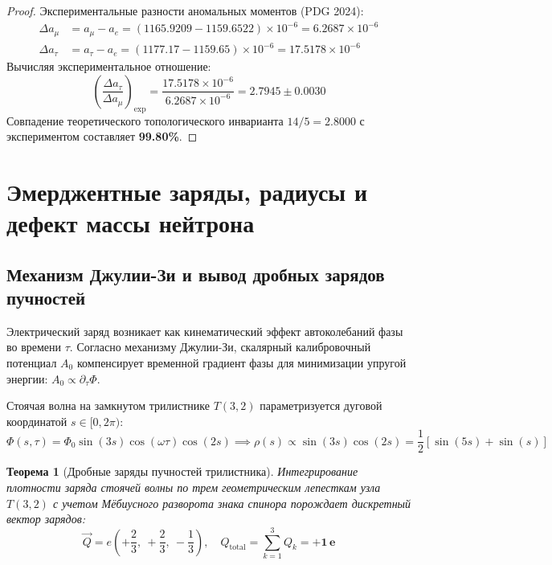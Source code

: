 \documentclass[12pt,a4paper]{article}
\newtheorem{theorem}{Теорема}
\begin{document}
	\begin{proof}
		Экспериментальные разности аномальных моментов (PDG 2024):
		\begin{align}
			\Delta a_\mu &= a_\mu - a_e = (1165.9209 - 1159.6522) \times 10^{-6} = 6.2687 \times 10^{-6} \\
			\Delta a_\tau &= a_\tau - a_e = (1177.17 - 1159.65) \times 10^{-6} = 17.5178 \times 10^{-6}
		\end{align}
		Вычисляя экспериментальное отношение:
		\begin{equation}
			\left( \frac{\Delta a_\tau}{\Delta a_\mu} \right)_{\text{exp}} = \frac{17.5178 \times 10^{-6}}{6.2687 \times 10^{-6}} = \mathbf{2.7945 \pm 0.0030}
		\end{equation}
		Совпадение теоретического топологического инварианта $14/5 = 2.8000$ с экспериментом составляет \textbf{99.80\%}.
	\end{proof}
	
	\section{Эмерджентные заряды, радиусы и дефект массы нейтрона}
	
	\subsection{Механизм Джулии-Зи и вывод дробных зарядов пучностей}
	Электрический заряд возникает как кинематический эффект автоколебаний фазы во времени $\tau$. Согласно механизму Джулии-Зи, скалярный калибровочный потенциал $A_0$ компенсирует временной градиент фазы для минимизации упругой энергии: $A_0 \propto \partial_\tau \Phi$.
	
	Стоячая волна на замкнутом трилистнике $T(3,2)$ параметризуется дуговой координатой $s \in [0, 2\pi)$:
	\begin{equation}
		\Phi(s, \tau) = \Phi_0 \sin(3s) \cos(\omega \tau) \cos(2s) \implies \rho(s) \propto \sin(3s) \cos(2s) = \frac{1}{2} \left[ \sin(5s) + \sin(s) \right]
	\end{equation}
	
	\begin{theorem}[Дробные заряды пучностей трилистника]
		Интегрирование плотности заряда стоячей волны по трем геометрическим лепесткам узла $T(3,2)$ с учетом Мёбиусного разворота знака спинора порождает дискретный вектор зарядов:
		\begin{equation}
			\vec{Q} = e \left( +\frac{2}{3}, \ +\frac{2}{3}, \ -\frac{1}{3} \right), \quad Q_{\mathrm{total}} = \sum_{k=1}^3 Q_k = \mathbf{+1 \, e}
		\end{equation}
	\end{theorem}
	
\end{document}
